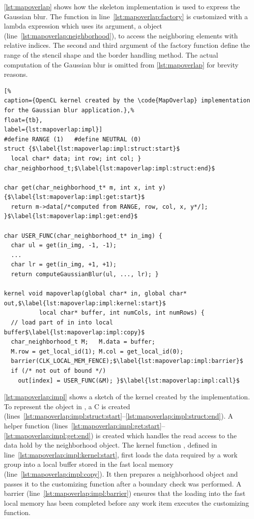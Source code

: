 \autoref{lst:mapoverlap} shows how the  skeleton implementation is used to express the Gaussian blur.
The  function in line~\ref{lst:mapoverlap:factory} is customized with a lambda expression which uses its argument, a  object (line~\ref{lst:mapoverlap:neighborhood}), to access the neighboring elements with relative indices.
The second and third argument of the factory function define the range of the stencil shape and the border handling method.
The actual computation of the Gaussian blur is omitted from \autoref{lst:mapoverlap} for brevity reasons.

\begin{lstlisting}[%
caption={OpenCL kernel created by the \code{MapOverlap} implementation for the Gaussian blur application.},%
float={tb},
label={lst:mapoverlap:impl}]
#define RANGE (1)   #define NEUTRAL (0)
struct {$\label{lst:mapoverlap:impl:struct:start}$
  local char* data; int row; int col; } char_neighborhood_t;$\label{lst:mapoverlap:impl:struct:end}$

char get(char_neighborhood_t* m, int x, int y) {$\label{lst:mapoverlap:impl:get:start}$
  return m->data[/*computed from RANGE, row, col, x, y*/]; }$\label{lst:mapoverlap:impl:get:end}$

char USER_FUNC(char_neighborhood_t* in_img) {
  char ul = get(in_img, -1, -1);
  ...
  char lr = get(in_img, +1, +1);
  return computeGaussianBlur(ul, ..., lr); }

kernel void mapoverlap(global char* in, global char* out,$\label{lst:mapoverlap:impl:kernel:start}$
          local char* buffer, int numCols, int numRows) {
  // load part of in into local buffer$\label{lst:mapoverlap:impl:copy}$
  char_neighborhood_t M;   M.data = buffer;
  M.row = get_local_id(1); M.col = get_local_id(0);
  barrier(CLK_LOCAL_MEM_FENCE);$\label{lst:mapoverlap:impl:barrier}$
  if (/* not out of bound */)
    out[index] = USER_FUNC(&M); }$\label{lst:mapoverlap:impl:call}$
\end{lstlisting}

\autoref{lst:mapoverlap:impl} shows a sketch of the \OpenCL kernel created by the  implementation.
To represent the  object in \OpenCL, a C  is created (lines~\ref{lst:mapoverlap:impl:struct:start}--\ref{lst:mapoverlap:impl:struct:end}).
A helper function  (lines~\ref{lst:mapoverlap:impl:get:start}--\ref{lst:mapoverlap:impl:get:end}) is created which handles the read access to the data hold by the neighborhood object.
The kernel function , defined in line~\ref{lst:mapoverlap:impl:kernel:start}, first loads the data required by a work group into a local buffer stored in the fast local \GPU memory (line~\ref{lst:mapoverlap:impl:copy}).
It then prepares a neighborhood object and passes it to the customizing function after a boundary check was performed.
A barrier (line~\ref{lst:mapoverlap:impl:barrier}) ensures that the loading into the fast local memory has been completed before any work item executes the customizing function.

